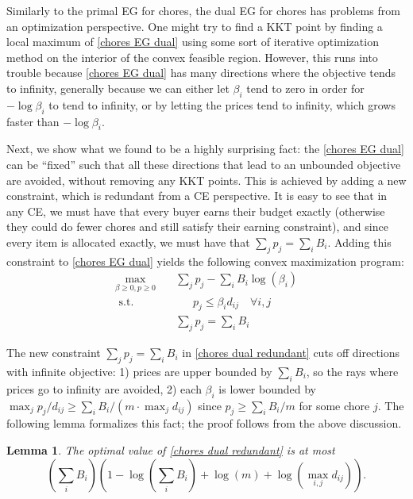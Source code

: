\documentclass[format=acmsmall,authorversion]{acmart}
\newtheorem{lemma}[theorem]{Lemma}
\newcommand{\ck}[1]{{\textcolor{red}{CK: #1}}}
\begin{document}
Similarly to the primal EG for chores, the dual EG for chores has problems from an optimization perspective. 
One might try to find a KKT point by finding a local maximum of \ref{chores EG dual} using some sort of iterative optimization method on the interior of the convex feasible region. However, this runs into trouble because \ref{chores EG dual} has many directions where the objective tends to infinity, generally because we can either let $\beta_i$ tend to zero in order for $-\log \beta_i$ to tend to infinity, or by letting the prices tend to infinity, which grows faster than $-\log\beta_i$.

Next, we show what we found to be a highly surprising fact: the \ref{chores EG dual} can be ``fixed'' such that all these directions that lead to an unbounded objective are avoided, without removing any KKT points.
This is achieved by adding a new constraint, which is redundant from a CE perspective. It is easy to see that in any CE, we must have that every buyer earns their budget exactly (otherwise they could do fewer chores and still satisfy their earning constraint), and since every item is allocated exactly, we must have that $\sum_j p_j = \sum_i B_i$.
Adding this constraint to \ref{chores EG dual} yields the following convex maximization program:
\begin{equation}
\begin{aligned}
    \max_{\beta \geq 0, p \geq 0} \quad &\sum_j p_j - \sum_i B_i \log(\beta_i) \\
    \text{ s.t. } \quad & \quad\;\; p_j \leq \beta_i d_{ij} \quad \forall i,j\\
    & \sum_j p_j = \sum_i B_i
\end{aligned} 
\tag{Chores Dual Redundant}
\label{chores dual redundant}
\end{equation}

The new constraint $\sum_j p_j = \sum_i B_i$ in \ref{chores dual redundant} cuts off directions with infinite objective: 1) prices are upper bounded by $\sum_i B_i$, so the rays where prices go to infinity are avoided, 2) each $\beta_i$ is lower bounded by $\max_j p_j / d_{ij} \ge \sum_i B_i/ (m \cdot \max_j d_{ij})$ since $p_j \ge \sum_i B_i /m$ for some chore $j$. The following lemma formalizes this fact; the proof follows from the above discussion.


\begin{lemma}\label{lem:CDR finite objective}
The optimal value of \ref{chores dual redundant} is at most $$\left(\sum_i B_i\right) \left(1-\log(\sum_i B_i) + \log(m)+ \log(\max_{i,j} d_{ij})\right).$$
\end{lemma}
\end{document}
